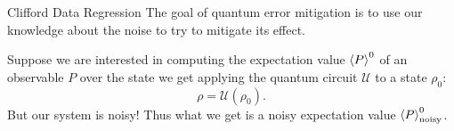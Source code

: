 \documentclass[aspectratio=169, 8pt, xcolor={svgnames}, hyperref={linkcolor=black}]{beamer}
\begin{document}
\begin{frame}{Clifford Data Regression}
\textcolor{carnelian}{The goal of quantum error mitigation is to use our knowledge about 
the noise to try to mitigate its effect.} \pause

Suppose we are interested in computing the expectation value $\braket{P}^0$ 
of an observable $P$
over the state we get applying the quantum circuit $\mathcal{U}$ to a state $\rho_0$:
$$ \rho = \mathcal{U}(\rho_0).$$ \pause
But our system is noisy! Thus what we get is a noisy expectation value $\braket{P}^0_{\rm noisy}$.



\end{frame}
\end{document}
